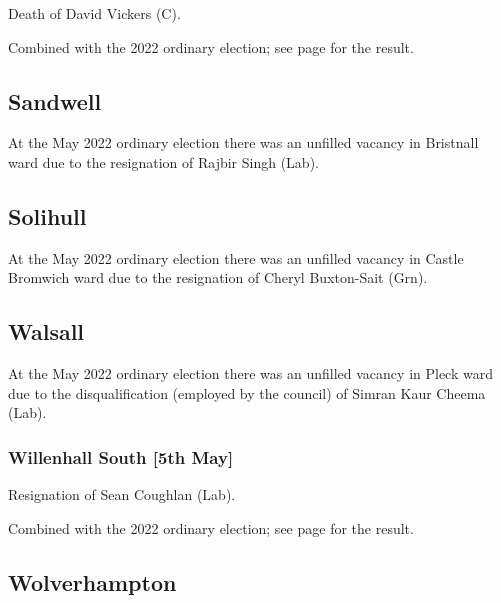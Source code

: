 \documentclass[a4paper,openany]{book}
\begin{document}
\begin{resultsiii}

Death of David Vickers (C).

Combined with the 2022 ordinary election; see page \pageref{DudleyHalesowenSouth} for the result.

\subsection*{Sandwell}

At the May 2022 ordinary election there was an unfilled vacancy in Bristnall ward due to the resignation of Rajbir Singh (Lab).%

\subsection*{Solihull}

At the May 2022 ordinary election there was an unfilled vacancy in Castle Bromwich ward due to the resignation of Cheryl Buxton-Sait (Grn).%

\subsection*{Walsall}

At the May 2022 ordinary election there was an unfilled vacancy in Pleck ward due to the disqualification (employed by the council) of Simran Kaur Cheema (Lab).%

\subsubsection*{Willenhall South \hspace*{\fill}\nolinebreak[1]%
	\enspace\hspace*{\fill}
	[5th May]}


Resignation of Sean Coughlan (Lab).

Combined with the 2022 ordinary election; see page \pageref{WalsallWillenhallSouth} for the result.

\subsection*{Wolverhampton}


\end{resultsiii}
\end{document}
